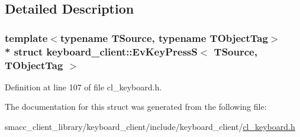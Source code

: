 \subsection{Detailed Description}
\subsubsection*{template$<$typename T\+Source, typename T\+Object\+Tag$>$\\*
struct keyboard\+\_\+client\+::\+Ev\+Key\+Press\+S$<$ T\+Source, T\+Object\+Tag $>$}



Definition at line 107 of file cl\+\_\+keyboard.\+h.



The documentation for this struct was generated from the following file\+:\begin{DoxyCompactItemize}
\item 
smacc\+\_\+client\+\_\+library/keyboard\+\_\+client/include/keyboard\+\_\+client/\hyperlink{cl__keyboard_8h}{cl\+\_\+keyboard.\+h}\end{DoxyCompactItemize}
